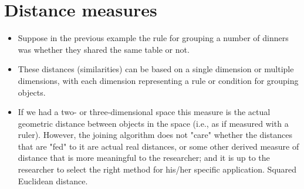 \documentclass[a4paper,12pt]{report}
\begin{document}
\section{Distance measures}
\begin{itemize}
\item Suppose in the previous example the rule for grouping a number of dinners was whether they shared the same table or not. 
\item These distances (similarities) can be based on a single dimension or multiple dimensions, with each dimension representing a rule or condition for grouping objects. 

\item If we had a two- or three-dimensional space this measure is the actual geometric distance between objects in the space (i.e., as if measured with a ruler). However, the joining algorithm does not "care" whether the distances that are "fed" to it are actual real distances, or some other derived measure of distance that is more meaningful to the researcher; and it is up to the researcher to select the right method for his/her specific application.
Squared Euclidean distance. 


\end{itemize}





\end{document}
